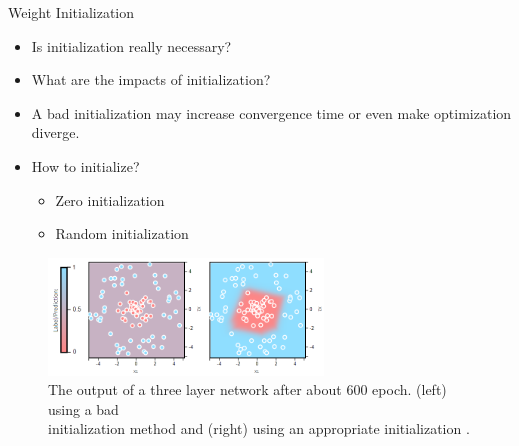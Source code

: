 \begin{frame}{Weight Initialization}
    \begin{itemize}
    	\item Is initialization really necessary?
    	\item What are the impacts of initialization?
    	\pause
    	\item A bad initialization may increase convergence time or even make optimization diverge.
    	\item How to initialize?
    	\begin{itemize}
    		\item Zero initialization
    		\item Random initialization
    	\end{itemize}
    \end{itemize}
	\begin{figure}[H]
		\centering
		\includegraphics[width=0.65\textwidth]{Images/wi-crucial.png}
		\caption{The output of a three layer network after about 600 epoch. (left) using a bad\\ initialization method and (right) using an appropriate initialization \cite{katanforoosh-kunin}.}
	\end{figure}
\end{frame}

